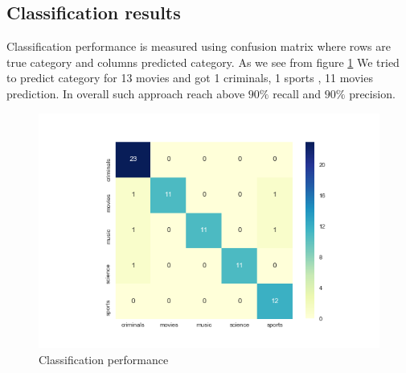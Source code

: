 \documentclass{article}
\begin{document}
\subsection{Classification results}
Classification performance is measured using confusion matrix where rows are true category and columns predicted category. As we see from figure \ref{confusion matrix} We tried to predict category for 13 movies and got 1 criminals, 1 sports , 11 movies prediction. In overall such approach reach above $90 \%$  recall and $90 \%$ precision.
\begin{figure}[H]
  \includegraphics[width=\linewidth]{images/confussion_matrix.png}
  \caption{Classification performance}
  \label{confusion matrix}
\end{figure}
\end{document}
